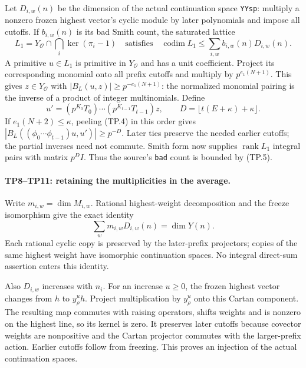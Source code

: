 \documentclass[11pt,a4paper]{article}
\numberwithin{equation}{section}
\theoremstyle{remark}\newtheorem{remark}[theorem]{Remark}
\begin{document}
Let $D_{i,w}(n)$ be the dimension of the actual continuation space
\texttt{YYsp}: multiply a nonzero frozen highest vector's cyclic module by
later polynomials and impose all cutoffs. If $b_{i,w}(n)$ is its bad Smith
count, the saturated lattice
\[
 L_1=Y_{\mathcal O}\cap\bigcap_i\ker(\pi_i-1)
 \quad\text{satisfies}\quad
 \operatorname{codim}L_1\le\sum_{i,w}b_{i,w}(n)D_{i,w}(n).
 \tag{TP.5}
\]
A primitive $u\in L_1$ is primitive in $Y_{\mathcal O}$ and has a unit
coefficient. Project its corresponding monomial onto all prefix cutoffs
and multiply by $p^{e_1(N+1)}$. This gives $z\in Y_{\mathcal O}$ with
$|B_L(u,z)|\ge p^{-e_1(N+1)}$: the normalized monomial pairing is the
inverse of a product of integer multinomials. Define
\[
 u'=(p^{K_0}T_0)\cdots(p^{K_{t-1}}T_{t-1})z,
 \qquad D=\lfloor t(E+\kappa)+\kappa\rfloor.
\]
If $e_1(N+2)\le\kappa$, peeling (TP.4) in this order gives
$|B_L((\phi_0\cdots\phi_{t-1})u,u')|\ge p^{-D}$.
Later ties preserve the needed earlier cutoffs; the partial inverses need
not commute. Smith form now supplies $\operatorname{rank}L_1$ integral
pairs with matrix $p^D I$. Thus the source's \texttt{bad} count is bounded
by (TP.5).

\paragraph{TP8--TP11: retaining the multiplicities in the average.}
Write $m_{i,w}=\dim M_{i,w}$. Rational highest-weight decomposition and the
freeze isomorphism give the exact identity
\[
 \sum_w m_{i,w}D_{i,w}(n)=\dim Y(n).
 \tag{TP.6}
\]
Each rational cyclic copy is preserved by the later-prefix projectors;
copies of the same highest weight have isomorphic continuation spaces.
No integral direct-sum assertion enters this identity.

Also $D_{i,w}$ increases with $n_i$. For an increase $u\ge0$, the frozen
highest vector changes from $h$ to $y_\rho^u h$. Project multiplication by
$y_\rho^u$ onto this Cartan component. The resulting map commutes with
raising operators, shifts weights and is nonzero on the highest line,
so its kernel is zero. It preserves later cutoffs because covector weights
are nonpositive and the Cartan projector commutes with the larger-prefix
action. Earlier cutoffs follow from freezing. This proves an injection of
the actual continuation spaces.
\end{document}
